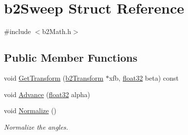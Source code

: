 \hypertarget{structb2_sweep}{}\section{b2\+Sweep Struct Reference}
\label{structb2_sweep}


{\ttfamily \#include $<$b2\+Math.\+h$>$}

\subsection*{Public Member Functions}
\begin{DoxyCompactItemize}
\item 
void \mbox{\hyperlink{structb2_sweep_a22ae50509de51876aefc48cd76248c61}{Get\+Transform}} (\mbox{\hyperlink{structb2_transform}{b2\+Transform}} $\ast$xfb, \mbox{\hyperlink{b2_settings_8h_aacdc525d6f7bddb3ae95d5c311bd06a1}{float32}} beta) const
\item 
void \mbox{\hyperlink{structb2_sweep_a35eb9b976ca87c9b8d758bec070c6c06}{Advance}} (\mbox{\hyperlink{b2_settings_8h_aacdc525d6f7bddb3ae95d5c311bd06a1}{float32}} alpha)
\item 
void \mbox{\hyperlink{structb2_sweep_ad66a3086bc7656df9cf7454013a2f61b}{Normalize}} ()
\begin{DoxyCompactList}\small\item\em Normalize the angles. \end{DoxyCompactList}\end{DoxyCompactItemize}
